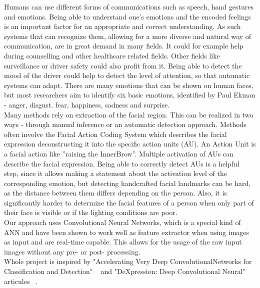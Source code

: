Humans can use different forms of communications such as speech, hand gestures and emotions. Being able to understand one’s emotions and the encoded feelings is an important factor for an appropriate and correct understanding. As such systems that can recognize them, allowing for a more diverse and natural way of communication, are in great demand in many fields. It could for example help during counselling and other healthcare related fields. Other fields like surveillance or driver safety could also profit from it. Being able to detect the mood of the driver could help to detect the level of attention, so that automatic systems can adapt. There are many emotions that can be shown on human faces, but most researchers aim to identify six basic emotions, identified by Paul Ekman - anger, disgust. fear, happiness, sadness and surprise.\\

Many methods rely on extraction of the facial region. This can be realized in two ways - through manual inference or an automatic detection approach. Methods often involve the Facial Action Coding System which describes the facial expression deconstructing it into the specific action units (AU). An Action Unit is a facial action like ”raising the InnerBrow”. Multiple activation of AUs can describe the facial expression. Being able to correctly detect AUs is a helpful step, since it allows making a statement about the activation level of the corresponding emotion, but detecting handcrafted facial landmarks can be hard, as the distance between them differs depending on the person. Also, it is significantly harder to determine the facial features of a person when only part of their face is visible or if the lighting conditions are poor.\\

Our approach uses Convolutional Neural Networks, which is a special kind of ANN and have been shown to work well as feature extractor when using images as input and are real-time capable. This allows for the usage of the raw input images without any pre- or post- processing.\\

Whole project is inspired by
"Accelerating Very Deep ConvolutionalNetworks for Classification and Detection"
~\cite{vdcnflsir}
and
"DeXpression: Deep Convolutional Neural" articules ~\cite{dcnnfer}.